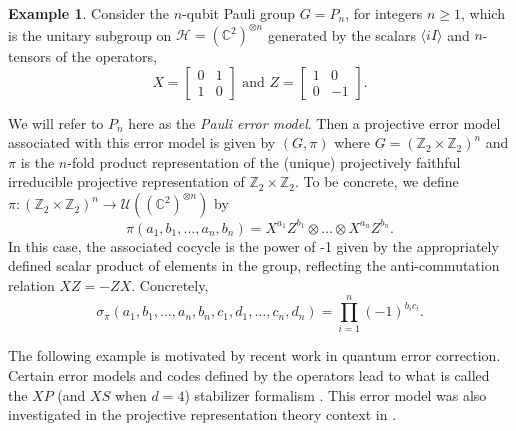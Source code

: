 \documentclass[11pt]{article}
\theoremstyle{definition}
\newtheorem{example}{Example}
\newcommand{\calU}{\mathcal{U}}
\begin{document}
\begin{example}\label{example:Pauli projective error model}
    Consider the $n$-qubit Pauli group $G= P_n$, for integers $n\geq 1$, which is the unitary subgroup on $\mathcal H = (\mathbb C^2)^{\otimes n}$ generated by the scalars $\langle iI\rangle$ and $n$-tensors of the operators, 
        \begin{equation*}
            X =
            \begin{bmatrix}
                0 & 1 \\
                1 & 0
            \end{bmatrix}
            \text{ and }
            Z =
            \begin{bmatrix}
                1 & 0 \\
                0 & -1
            \end{bmatrix} .
        \end{equation*}
        
    We will refer to $P_n$ here as the {\it Pauli error model}. Then a projective error model associated with this error model is given by $(G,\pi)$ where $G = (\mathbb Z_2 \times \mathbb Z_2)^n$ and $\pi$ is the $n$-fold product representation of the (unique) projectively faithful irreducible projective representation of $\mathbb Z_2 \times \mathbb Z_2$. To be concrete, we define 
    $\pi \colon (\mathbb Z_2 \times \mathbb Z_2)^n \to \calU((\mathbb C^2)^{\otimes n})$ by 
    \begin{equation}\label{canonical} 
        \pi (a_1,b_1,\ldots , a_n, b_n) = X^{a_1} Z^{b_1} \otimes \ldots \otimes X^{a_n} Z^{b_n}. 
    \end{equation} 
    In this case, the associated cocycle is the power of -1 given by the appropriately defined scalar product of elements in the group, reflecting the anti-commutation relation $XZ = -ZX$. Concretely,
    \[
        \sigma_{\pi}(a_1,b_1,\ldots,a_n,b_n,c_1,d_1,\ldots,c_n,d_n) = \prod_{i = 1}^{n} (-1)^{b_ic_i}.
    \]
\end{example}


The following example is motivated by recent work in quantum error correction. Certain error models and codes defined by the operators lead to what is called the $XP$ (and $XS$ when $d=4$) stabilizer formalism \cite{ni2015non,Webster2022}. This error model was also investigated in the projective representation theory context in \cite{Eidesen2025}.  
\end{document}

